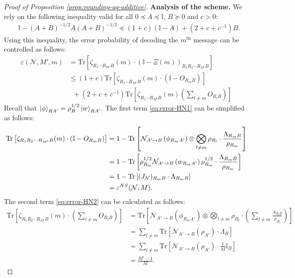 \documentclass[a4paper,onecolumn,11pt,accepted=2025-10-01]{quantumarticle}
\newcommand*{\dI}{\mathbb{I}}
\newcommand*{\cN}{\mathcal{N}}
\newcommand*{\eps}{\varepsilon}
\newcommand*{\tr}[1]{\mathrm{Tr}\left[#1\right]}
\newcommand*{\mge}{\succcurlyeq}
\newcommand*{\mle}{\preccurlyeq}
\begin{document}
\begin{proof}[Proof of Proposition \ref{prop:rounding-qq-additive}]
\textbf{Analysis of the scheme.} We rely on the following inequality \cite{Hayashi2003Jun} valid for all $0\mle A \mle \dI$, $B\mge 0$ and $c>0$:
\begin{align}
    &\dI - (A+B)^{-1/2}A(A+B)^{-1/2}
    \mle (1+c)(\dI-A) + (2+c+c^{-1})B.
\end{align}
Using this inequality, the error probability of decoding the $m^{\text{th}}$ message can be controlled  as follows:   
    \begin{align}
        \eps(\cN, M', m) 
        &= \tr{\zeta_{R_1\cdots R_{M'} B}(m) \cdot (\dI -\Xi (m))_{R_1R_2\cdots R_{M'} B} }
        \\&\le (1+c)\tr{\zeta_{R_1\cdots R_{M'} B}(m) \cdot (\dI-O_{R_mB})  } \label{eq:error-HN1}
        \\&\;\; +\!(2+c+c^{-1}) \tr{\zeta_{R_1\cdots R_{M'} B}(m)  ( \textstyle\sum_{l\neq m} O_{R_lB} )  }
        \label{eq:error-HN2}
    \end{align}
Recall that $\ket{\phi}_{R A'}=\rho_{R}^{1/2}\ket{w}_{RA'} $.
The first term  \eqref{eq:error-HN1} can be simplified as follows: 
\begin{align}
    \tr{\zeta_{R_1R_2\cdots R_{M'} B} (m)\cdot (\dI-O_{R_mB}) } 
    &= 1-\tr{\cN_{A'\rightarrow B}\left(\phi_{R_m A'}\right)\otimes \bigotimes_{l\neq m} \rho_{R_l}\cdot  \frac{ \Lambda_{R_mB}}{\rho_{R_m}}}
    \\&= 1-\tr{ \rho_{R_m}^{1/2}\cN_{A'\rightarrow B}\left(w_{R_m A'}\right) \rho_{R_m}^{1/2}\cdot  \frac{ \Lambda_{R_mB}}{\rho_{R_m}}}
    \\&=1- \tr{(J_{\cN})_{R_mB} \cdot \Lambda_{R_mB}}
    \\&= \eps_{}^{\rm{NS}}(\cN,M). \label{eq:HN-first-term}
\end{align}
The second term  \eqref{eq:error-HN2} can be calculated as follows: 
\begin{align}
    \tr{\zeta_{R_1R_2\cdots R_{M'} B}(m) \cdot (\textstyle\sum_{l\neq m} O_{R_lB} )}
   &= \tr{\cN_{A'\rightarrow B}\left(\phi_{R_m A'}\right)\otimes \bigotimes_{l\neq m} \rho_{R_l} \cdot (\textstyle\sum_{l\neq m} \frac{ \Lambda_{R_lB}}{\rho_{R_l}} ) }
    \\&= \textstyle\sum_{l\neq m} \tr{ \cN_{A'\rightarrow B}\left(\rho_{ A'}\right) \cdot  \Lambda_{B}} 
    \\&=  \textstyle\sum_{l\neq m} \tr{ \cN_{A'\rightarrow B}\left(\rho_{ A'}\right) \cdot  \frac{1}{M}\dI_B}
    \\&= \frac{M'-1}{M}. \label{eq:HN-second-term}
\end{align}

\end{proof}
\end{document}
